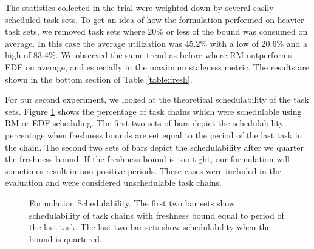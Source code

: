 The statistics collected in the trial were weighted down by several easily scheduled task sets. To get an idea of how the formulation performed on heavier task sets, we removed task sets where 20\% or less of the bound was consumed on average. In this case the average utilization was 45.2\% with a low of 20.6\% and a high of 83.4\%. We observed the same trend as before where RM outperforms EDF on average, and especially in the maximum staleness metric. The results are shown in the bottom section of Table \ref{table:fresh}.

For our second experiment, we looked at the theoretical schedulability of the task sets. Figure \ref{fig:Schedulability} shows the percentage of task chains which were schedulable using RM or EDF scheduling. The first two sets of bars depict the schedulability percentage when freshness bounds are set equal to the period of the last task in the chain. The second two sets of bars depict the schedulability after we quarter the freshness bound. If the freshness bound is too tight, our formulation will sometimes result in non-positive periods. These cases were included in the evaluation and were considered unschedulable task chains.

\begin{figure}[h]
\centering
{}
\caption{Formulation Schedulability. The first two bar sets show schedulability of task chains with freshness bound equal to period of the last task. The last two bar sets show schedulability when the bound is quartered.}
\label{fig:Schedulability}
\end{figure}

